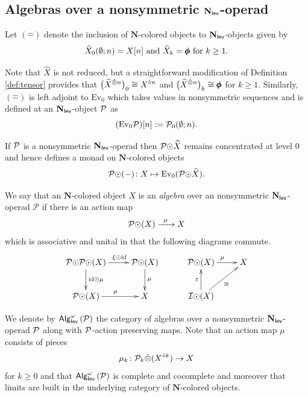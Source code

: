 \subsection{Algebras over a nonsymmetric $\mathbf{N}_{\mathsf{lev}}$-operad}
Let $(\widehat{-})$ denote the inclusion of $\mathbf{N}$-colored objects to $\mathbf{N}_{\mathsf{lev}}$-objects given by \[\text{$\widehat{X}_0(\emptyset;n)=X[n]$ and $\widehat{X}_k=\pmb{\phi}$ for $ k\geq 1$.}\] 

Note that $\widehat{X}$ is not reduced, but a straightforward modification of Definition \ref{def:tensor} provides that $\big(\widehat{X}^{\hat{\otimes} n}\big)_0\cong X^{\hat{\circ} n}$ and $\big(\widehat{X}^{\hat{\otimes} n}\big)_k\cong \pmb{\phi}$ for $k\geq 1$. Similarly, $(\widehat{-})$ is left adjoint to $\mathrm{Ev}_0$ which takes values in nonsymmetric sequences and is defined at an $\mathbf{N}_{\mathsf{lev}}$-object $\mathcal{P}$ as \[(\mathrm{Ev}_0\mathcal{P})[n]:=\mathcal{P}_0(\emptyset;n).\] 

If $\mathcal{P}$ is a nonsymmetric $\mathbf{N}_{\mathsf{lev}}$-operad then $\mathcal{P}{\odot} \widehat{X}$ remains concentrated at level $0$ and hence defines a monad on $\mathbf{N}$-colored objects \[\mathcal{P}{\odot}(-)\colon X\mapsto \mathrm{Ev}_0(\mathcal{P}{\odot} \widehat{X}).\] 

\begin{definition}  \label{def-nonsym}
We say that an $\mathbf{N}$-colored object $X$ is an \textit{algebra} over an nonsymmetric $\mathbf{N}_{\mathsf{lev}}$-operad $\mathcal{P}$ if there is an action map \[\mathcal{P}{\odot} (X)\xrightarrow{\;\; \mu\;\;} X\] which is associative and unital in that the following diagrams commute. \[ \xymatrix{ \Cal{P}\circdot \Cal{P} \circdot (X) \ar[r]^<(.3){\xi\circdot\id} \ar[d]^{\id\circdot \mu}& \Cal{P}\circdot (X) \ar[d]^{\mu} \\ \Cal{P}\circdot (X)\ar[r]^{\mu} & X } \hspace{1cm} \xymatrix{ \Cal{P}\circdot (X) \ar[r]^{\mu} & X \\ \Cal{I}\circdot (X)  \ar[u]^{\varepsilon} \ar[ur]_{\cong} }\]
\end{definition} 

We denote by $\mathsf{Alg}^{\omega}_{\mathsf{lev}}\left(\mathcal{P}\right)$ the category of algebras over a nonsymmetric $\mathbf{N}_{\mathsf{lev}}$-operad $\mathcal{P}$ along with $\mathcal{P}$-action preserving maps. Note that an action map $\mu$ consists of pieces \[\mu_k\colon \mathcal{P}_{k} \dot{\otimes} (X^{\hat{\circ} k})\to X\] for $k\geq 0$ and that $\mathsf{Alg}^{\omega}_{\mathsf{lev}}\left(\mathcal{P}\right)$ is complete and cocomplete and moreover that limits are built in the underlying category of $\mathbf{N}$-colored objects. 

